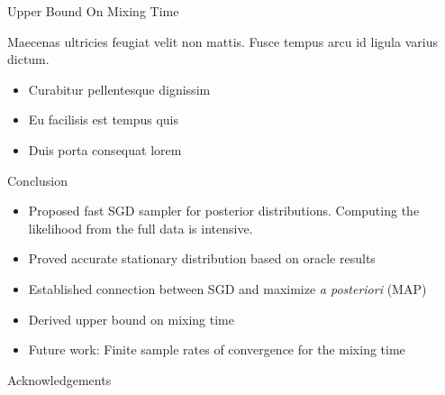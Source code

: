 \documentclass[final]{beamer}
\newlength{\onecolwid}
\begin{document}
\begin{frame}[t]
\begin{columns}[t]
\begin{column}{\onecolwid}

\begin{block}{Upper Bound On Mixing Time}

Maecenas ultricies feugiat velit non mattis. Fusce tempus arcu id ligula varius dictum.
\begin{itemize}
\item Curabitur pellentesque dignissim
\item Eu facilisis est tempus quis
\item Duis porta consequat lorem
\end{itemize}

\end{block}


\begin{block}{Conclusion}

\begin{itemize}
\item Proposed fast SGD sampler for posterior distributions. Computing the likelihood from the full data is intensive.
\item Proved accurate stationary distribution based on oracle results
\item Established connection between SGD and maximize \emph{a posteriori} (MAP)
\item Derived upper bound on mixing time
\item Future work: Finite sample rates of convergence for the mixing time
\end{itemize}

\end{block}


\begin{block}{Acknowledgements}

\small{} \\


\end{block}
\end{column}
\end{columns}
\end{frame}
\end{document}
